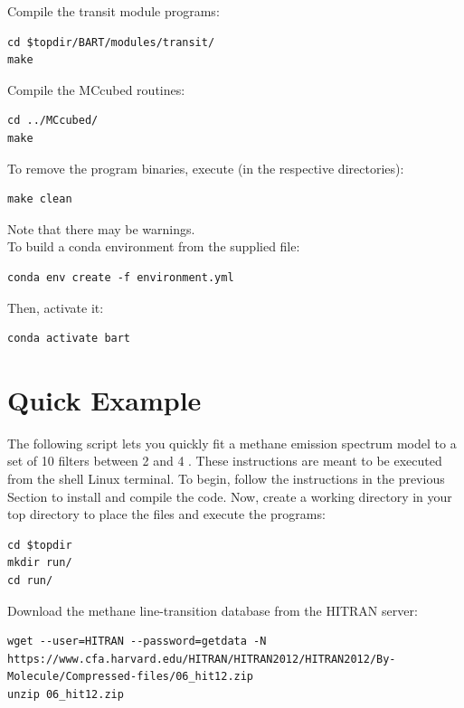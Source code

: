 \documentclass[letterpaper, 12pt]{article}
\begin{document}
\noindent Compile the transit module programs:
\begin{verbatim}
cd $topdir/BART/modules/transit/
make
\end{verbatim}

\noindent Compile the {\tttm MCcubed} routines:
\begin{verbatim}
cd ../MCcubed/
make
\end{verbatim}

\noindent To remove the program binaries, execute (in the respective
directories):
\begin{verbatim}
make clean
\end{verbatim}

\noindent Note that there may be warnings. \\

\noindent To build a conda environment from the supplied file:
\begin{verbatim}
conda env create -f environment.yml
\end{verbatim}

\noindent Then, activate it:
\begin{verbatim}
conda activate bart
\end{verbatim}

\section{Quick Example}
\label{sec:quick-example}

The following script lets you quickly fit a methane emission spectrum
model to a set of 10 filters between 2 and 4 {\microns}.  These
instructions are meant to be executed from the shell Linux terminal.  To
begin, follow the instructions in the previous Section to install and
compile the code. Now, create a working directory in your top
directory to place the files and execute the programs:

{\fontsize{9.8}{1em}\selectfont 
\begin{verbatim}
cd $topdir
mkdir run/
cd run/
\end{verbatim}}

\noindent Download the methane line-transition database from the HITRAN server:

{\fontsize{9.8}{1em}\selectfont 
\begin{lstlisting}[breaklines]
wget --user=HITRAN --password=getdata -N https://www.cfa.harvard.edu/HITRAN/HITRAN2012/HITRAN2012/By-Molecule/Compressed-files/06_hit12.zip 
unzip 06_hit12.zip
\end{lstlisting}}
\end{document}
